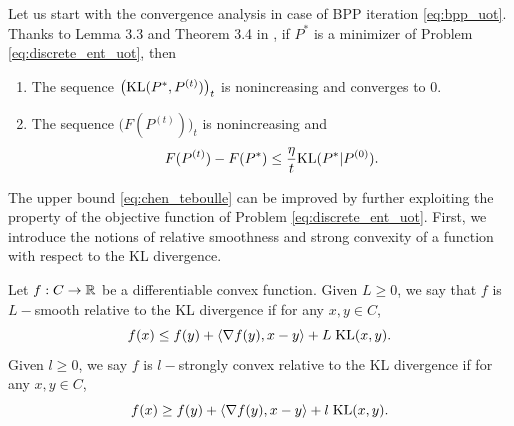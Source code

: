 Let us start with the convergence analysis in case of BPP iteration \ref{eq:bpp_uot}.
Thanks to Lemma 3.3 and Theorem 3.4 in \citep{Chen93}, if $P^*$ is a minimizer of
Problem \ref{eq:discrete_ent_uot}, then
\begin{enumerate}
  \item The sequence $\big( \text{KL}(P^*, P^{(t)}) \big)_t$ is nonincreasing and converges to $0$.
  \item The sequence $\big( F(P^{(t)}) \big)_t$ is nonincreasing and
  \begin{align}
    \label{eq:chen_teboulle}
    F(P^{(t)}) - F(P^*) \leq \frac{\eta}{t} \text{KL}(P^* | P^{(0)}).
  \end{align}
\end{enumerate}
The upper bound \ref{eq:chen_teboulle} can be improved by further exploiting the property of
the objective function of Problem \ref{eq:discrete_ent_uot}.
First, we introduce the notions of relative smoothness \citep{Bauschke17} and
strong convexity \citep{Lu18} of a function with respect to the KL divergence.
\begin{definition}
  \label{def:smooth-convex}
  Let $f:C \to \mathbb R$ be a differentiable convex function.
  Given $L \geq 0$, we say that $f$ is $L-$smooth relative to the KL divergence
  if for any $x, y \in C$,
  \begin{equation*}
    f(x) \leq f(y) + \langle \nabla f(y), x - y \rangle + L \; \text{KL}(x, y).
  \end{equation*}
  Given $l \geq 0$, we say $f$ is $l-$strongly convex relative to the KL divergence
  if for any $x, y \in C$,
  \begin{equation*}
    f(x) \geq f(y) + \langle \nabla f(y), x - y \rangle + l\; \text{KL}(x, y).
  \end{equation*}
\end{definition}

